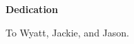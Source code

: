 \cleardoublepage
{}    %

\begin{center}\textbf{Dedication}\end{center}

\begin{center}
To Wyatt, Jackie, and Jason.    
\end{center}

\cleardoublepage
{}    %

\renewcommand\contentsname{Table of Contents}
\tableofcontents
\cleardoublepage
{}    %

{\renewcommand{\addvspace}[1]{} \listoffigures}
\cleardoublepage
{}		%

{\renewcommand{\addvspace}[1]{} \listoftables}
\cleardoublepage
{}		%






